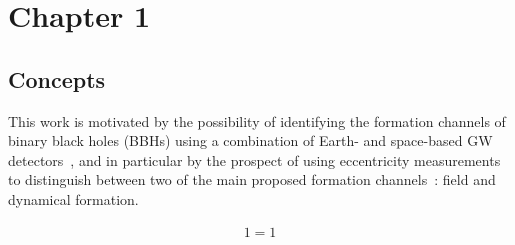 

\chapter{Chapter 1}


\section{Concepts}



This work is motivated by the possibility of identifying the formation channels
of binary black holes (BBHs) using a combination of Earth- and space-based GW
detectors~\cite{Sesana:2016ljz,Wong:2018uwb,Cutler:2019krq,Gerosa:2019dbe},
and in particular by the prospect of using eccentricity measurements to distinguish
between two of the main proposed formation
channels~\cite{Nishizawa:2016jji,Breivik:2016ddj,Nishizawa:2016eza}: field and dynamical formation.


\begin{align}
1= 1          \label{a}
\end{align}


